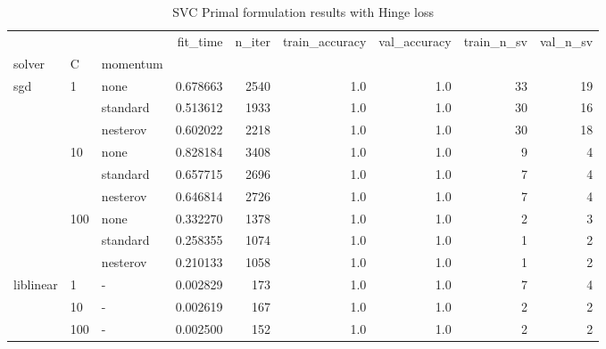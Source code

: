 \begin{table}[H]
\centering
\caption{SVC Primal formulation results with Hinge loss}
\label{primal_svc_hinge_cv_results}
\begin{tabular}{lllrrrrrr}
\toprule
          &     &   &  fit\_time &  n\_iter &  train\_accuracy &  val\_accuracy &  train\_n\_sv &  val\_n\_sv \\
solver & C & momentum &           &         &                 &               &             &           \\
\midrule
sgd & 1   & none &  0.678663 &    2540 &             1.0 &           1.0 &          33 &        19 \\
          &     & standard &  0.513612 &    1933 &             1.0 &           1.0 &          30 &        16 \\
          &     & nesterov &  0.602022 &    2218 &             1.0 &           1.0 &          30 &        18 \\
          & 10  & none &  0.828184 &    3408 &             1.0 &           1.0 &           9 &         4 \\
          &     & standard &  0.657715 &    2696 &             1.0 &           1.0 &           7 &         4 \\
          &     & nesterov &  0.646814 &    2726 &             1.0 &           1.0 &           7 &         4 \\
          & 100 & none &  0.332270 &    1378 &             1.0 &           1.0 &           2 &         3 \\
          &     & standard &  0.258355 &    1074 &             1.0 &           1.0 &           1 &         2 \\
          &     & nesterov &  0.210133 &    1058 &             1.0 &           1.0 &           1 &         2 \\
liblinear & 1   & - &  0.002829 &     173 &             1.0 &           1.0 &           7 &         4 \\
          & 10  & - &  0.002619 &     167 &             1.0 &           1.0 &           2 &         2 \\
          & 100 & - &  0.002500 &     152 &             1.0 &           1.0 &           2 &         2 \\
\bottomrule
\end{tabular}
\end{table}
